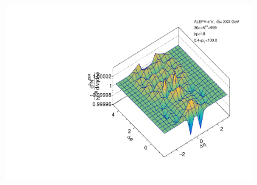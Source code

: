 \begin{figure}[htbp]
\begin{minipage}[b]{0.32\linewidth}
  \end{minipage}
  \begin{minipage}[b]{0.32\linewidth}
    \centering
    \includegraphics[width=\linewidth]{images/TwoParticleCorrelation/LEP2_BEAM/LEP2_BEAM_r_ratio_30_999.pdf}
    \label{fig:LEP2 Beam Axis, Ratio Plot, Multiplicity 30-999, Ratio}
  \end{minipage}
\end{figure}

